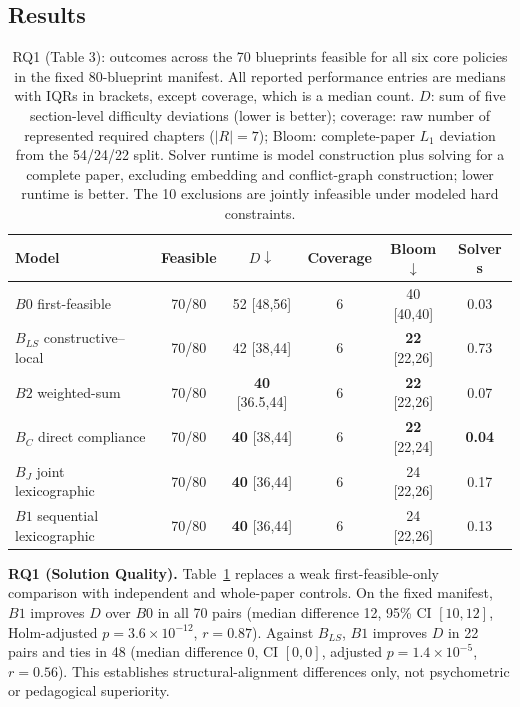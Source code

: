 \documentclass[runningheads]{llncs}
\begin{document}
\subsection{Results}

\begin{table}[t]
\caption{RQ1 (Table 3): outcomes across the 70 blueprints feasible for all six core policies in the fixed 80-blueprint manifest. All reported performance entries are medians with IQRs in brackets, except coverage, which is a median count. $D$: sum of five section-level difficulty deviations (lower is better); coverage: raw number of represented required chapters ($|R|=7$); Bloom: complete-paper $L_1$ deviation from the 54/24/22 split. Solver runtime is model construction plus solving for a complete paper, excluding embedding and conflict-graph construction; lower runtime is better. The 10 exclusions are jointly infeasible under modeled hard constraints.}
\label{tab:rq1}
\centering
\small
\begin{tabular}{@{}lccccc@{}}
\toprule
\textbf{Model} & \textbf{Feasible} & $D\downarrow$ & \textbf{Coverage} & \textbf{Bloom}$\downarrow$ & \textbf{Solver s} \\
\midrule
$B0$ first-feasible        & 70/80 & 52 [48,56] & 6 & 40 [40,40] & 0.03 \\
$B_{LS}$ constructive--local & 70/80 & 42 [38,44] & 6 & \textbf{22} [22,26] & 0.73 \\
$B2$ weighted-sum          & 70/80 & \textbf{40} [36.5,44] & 6 & \textbf{22} [22,26] & 0.07 \\
$B_C$ direct compliance    & 70/80 & \textbf{40} [38,44] & 6 & \textbf{22} [22,24] & \textbf{0.04} \\
$B_J$ joint lexicographic  & 70/80 & \textbf{40} [36,44] & 6 & 24 [22,26] & 0.17 \\
$B1$ sequential lexicographic & 70/80 & \textbf{40} [36,44] & 6 & 24 [22,26] & 0.13 \\
\bottomrule
\end{tabular}
\end{table}

\noindent\textbf{RQ1 (Solution Quality).} Table~\ref{tab:rq1} replaces a weak first-feasible-only comparison with independent and whole-paper controls. On the fixed manifest, $B1$ improves $D$ over $B0$ in all 70 pairs (median difference 12, 95\% CI $[10,12]$, Holm-adjusted $p=3.6{\times}10^{-12}$, $r=0.87$). Against $B_{LS}$, $B1$ improves $D$ in 22 pairs and ties in 48 (median difference 0, CI $[0,0]$, adjusted $p=1.4{\times}10^{-5}$, $r=0.56$). This establishes structural-alignment differences only, not psychometric or pedagogical superiority.
\end{document}
